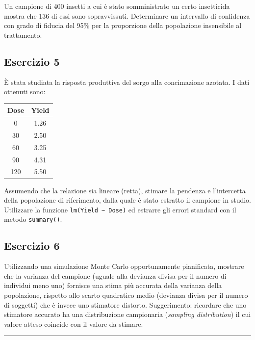 \documentclass[a4paper,12pt,oneside]{book}
\begin{document}
Un campione di 400 insetti a cui è stato somministrato un certo insetticida mostra che 136 di essi sono sopravvissuti. Determinare un intervallo di confidenza con grado di fiducia del 95\% per la proporzione della popolazione insensibile al trattamento.

\hypertarget{esercizio-5-3}{%
\subsection{Esercizio 5}\label{esercizio-5-3}}

È stata studiata la risposta produttiva del sorgo alla concimazione azotata. I dati ottenuti sono:

\begin{longtable}[]{@{}cc@{}}
\toprule
Dose & Yield \\
\midrule
\endhead
0 & 1.26 \\
30 & 2.50 \\
60 & 3.25 \\
90 & 4.31 \\
120 & 5.50 \\
\bottomrule
\end{longtable}

Assumendo che la relazione sia lineare (retta), stimare la pendenza e l'intercetta della popolazione di riferimento, dalla quale è stato estratto il campione in studio. Utilizzare la funzione \texttt{lm(Yield\ \textasciitilde{}\ Dose)} ed estrarre gli errori standard con il metodo \texttt{summary()}.

\hypertarget{esercizio-6-1}{%
\subsection{Esercizio 6}\label{esercizio-6-1}}

Utilizzando una simulazione Monte Carlo opportunamente pianificata, mostrare che la varianza del campione (uguale alla devianza divisa per il numero di individui meno uno) fornisce una stima più accurata della varianza della popolazione, rispetto allo scarto quadratico medio (devianza divisa per il numero di soggetti) che è invece uno stimatore distorto. Suggerimento: ricordare che uno stimatore accurato ha una distribuzione campionaria (\emph{sampling distribution}) il cui valore atteso coincide con il valore da stimare.

\begin{center}\rule{0.5\linewidth}{0.5pt}\end{center}
\end{document}
